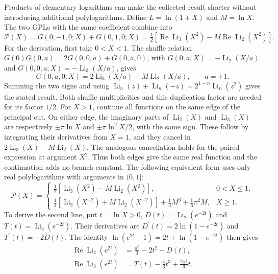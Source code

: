 Products of elementary logarithms can make the collected result shorter without introducing additional polylogarithms. Define $L=\ln(1+X)$ and $M=\ln X$. The two GPLs with the same coefficient combine into
\begin{equation}
\mathcal P(X)=G(0,-1,0;X)+G(0,1,0;X)=\tfrac12\left[\operatorname{Re}\operatorname{Li}_3(X^2)-M\operatorname{Re}\operatorname{Li}_2(X^2)\right].
\end{equation}
For the derivation, first take $0<X<1$. The shuffle relation $G(0)G(0,a)=2G(0,0,a)+G(0,a,0)$, with $G(0,a;X)=-\operatorname{Li}_2(X/a)$ and $G(0,0,a;X)=-\operatorname{Li}_3(X/a)$, gives
\begin{equation}
 G(0,a,0;X)=2\operatorname{Li}_3(X/a)-M\operatorname{Li}_2(X/a),\qquad a=\pm1.
\end{equation}
Summing the two signs and using $\operatorname{Li}_n(z)+\operatorname{Li}_n(-z)=2^{1-n}\operatorname{Li}_n(z^2)$ gives the stated result. Both shuffle multiplicities and this duplication factor are needed for its factor $1/2$. For $X>1$, continue all functions on the same edge of the principal cut. On either edge, the imaginary parts of $\operatorname{Li}_2(X)$ and $\operatorname{Li}_3(X)$ are respectively $\pm\pi\ln X$ and $\pm\pi\ln^2X/2$, with the same sign. These follow by integrating their derivatives from $X=1$, and they cancel in $2\operatorname{Li}_3(X)-M\operatorname{Li}_2(X)$. The analogous cancellation holds for the paired expression at argument $X^2$. Thus both edges give the same real function and the continuation adds no branch constant. The following equivalent form uses only real polylogarithms with arguments in $(0,1]$:
\begin{equation}
\mathcal P(X)=\begin{cases}\tfrac12[\operatorname{Li}_3(X^2)-M\operatorname{Li}_2(X^2)],&0<X\leq1,\\ \tfrac12[\operatorname{Li}_3(X^{-2})+M\operatorname{Li}_2(X^{-2})]+\tfrac13M^3+\tfrac16\pi^2M,&X\geq1.\end{cases}
\end{equation}
To derive the second line, put $t=\ln X>0$, $D(t)=\operatorname{Li}_2(e^{-2t})$ and $T(t)=\operatorname{Li}_3(e^{-2t})$. Their derivatives are $D^{\prime}(t)=2\ln(1-e^{-2t})$ and $T^{\prime}(t)=-2D(t)$. The identity $\ln(e^{2t}-1)=2t+\ln(1-e^{-2t})$ then gives
\begin{align}
\operatorname{Re}\operatorname{Li}_2(e^{2t})&=\frac{\pi^2}{3}-2t^2-D(t),\\
\operatorname{Re}\operatorname{Li}_3(e^{2t})&=T(t)-\frac43t^3+\frac{2\pi^2}{3}t.
\end{align}
